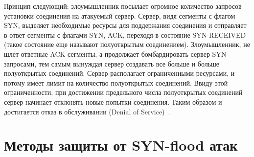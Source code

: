 \documentclass{bmstu}
\begin{document}
Принцип следующий: злоумышленник посылает огромное количество запросов установки соединения на атакуемый сервер. Сервер, видя сегменты с флагом SYN, выделяет необходимые ресурсы для поддержания соединения и отправляет в ответ сегменты с флагами SYN, ACK, переходя в состояние SYN-RECEIVED (такое состояние еще называют полуоткрытым соединением). Злоумышленник, не шлет ответные ACK сегменты, а продолжает бомбардировать сервер SYN-запросами, тем самым вынуждая сервер создавать все больше и больше полуоткрытых соединений. Сервер располагает ограниченными ресурсами, и потому имеет лимит на количество полуоткрытых соединений. Ввиду этой ограниченности, при достижении предельного числа полуоткрытых соединений сервер начинает отклонять новые попытки соединения. Таким образом и достигается отказ в обслуживании (Denial of Service)~\cite{synflood}.









\section*{Методы защиты от SYN-flood атак}
\end{document}
